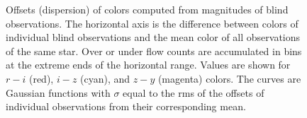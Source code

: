 \documentclass[manuscript]{aastex}
\begin{document}
\begin{figure}
\caption{Offsets (dispersion) of colors computed from magnitudes of blind observations.
   The horizontal axis is the difference between colors of individual blind observations and the mean color of all observations of the same star.
   Over or under flow counts are accumulated in bins at the extreme ends of the horizontal range.
   Values are shown for $r-i$ (red), $i-z$ (cyan), and $z-y$ (magenta) colors.
   The curves are Gaussian functions with $\sigma$ equal to the rms of the offsets of individual observations from their corresponding mean. 
          \label{fig:blindobs_color}}
\end{figure} 
\end{document}
